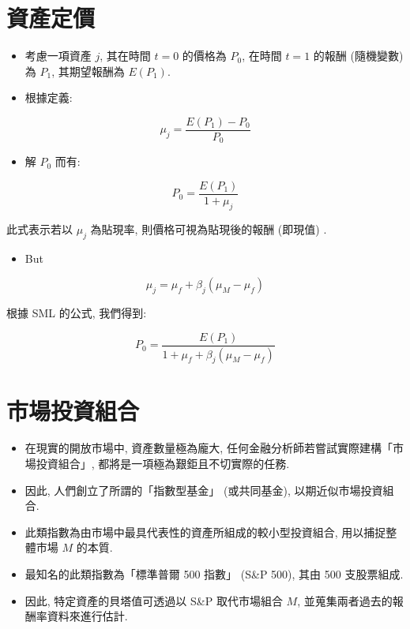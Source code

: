 \documentclass[letterpaper]{article}
\begin{document}
\section{資產定價}
\begin{itemize}
	\item 考慮一項資產 $j$, 其在時間 $t=0$ 的價格為 $P_{0}$, 在時間 $t=1$ 的報酬 (隨機變數) 為 $P_{1}$, 其期望報酬為 $E\left (P_{1}\right) $. 
	\item 根據定義: 
\end{itemize}


$$
\mu_{j}=\frac{E\left (P_{1}\right) -P_{0}}{P_{0}}
$$

\begin{itemize}
  \item  解 $P_{0}$ 而有: 
\end{itemize}

$$
P_{0}=\frac{E\left (P_{1}\right) }{1+\mu_{j}}
$$

此式表示若以 $\mu_{j}$ 為貼現率, 則價格可視為貼現後的報酬 (即現值) . 


\begin{itemize}
  \item But
\end{itemize}

$$
\mu_{j}=\mu_{f}+\beta_{j}\left (\mu_{M}-\mu_{f}\right) 
$$

根據 SML 的公式, 我們得到: 

$$
P_{0}=\frac{E\left (P_{1}\right) }{1+\mu_{f}+\beta_{j}\left (\mu_{M}-\mu_{f}\right) }
$$

\section*{市場投資組合}
\begin{itemize}
	\item 在現實的開放市場中, 資產數量極為龐大, 任何金融分析師若嘗試實際建構「市場投資組合」, 都將是一項極為艱鉅且不切實際的任務. 
	\item 因此, 人們創立了所謂的「指數型基金」 (或共同基金), 以期近似市場投資組合. 
	\item 此類指數為由市場中最具代表性的資產所組成的較小型投資組合, 用以捕捉整體市場 $M$ 的本質. 
	\item 最知名的此類指數為「標準普爾 500 指數」 (S\&P 500), 其由 500 支股票組成. 
	\item 因此, 特定資產的貝塔值可透過以 S\&P 取代市場組合 $M$, 並蒐集兩者過去的報酬率資料來進行估計. 
\end{itemize}
\end{document}
